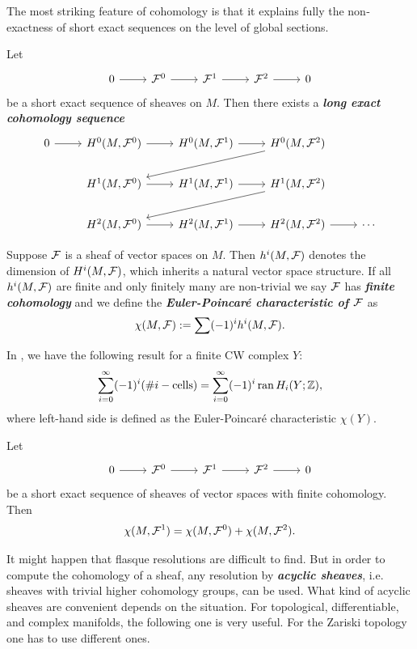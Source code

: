 The most striking feature of cohomology is that it explains fully the non­ exactness of short exact sequences on the level of global sections.
\begin{prop}
	Let
	\[\begin{tikzcd}
		0\arrow[r]&\Fc^0\arrow[r]&\Fc^1\arrow[r]&\Fc^2\arrow[r]&0
	\end{tikzcd}\]
	be a short exact sequence of sheaves on $M$. Then there exists a \textbf{\textit{long exact cohomology sequence}}
	\[\begin{tikzcd}
		0\arrow[r]&H^0(M,\Fc^0)\arrow[r]&H^0(M,\Fc^1)\arrow[r]&H^0(M,\Fc^2)\arrow[dll]\\
		&H^1(M,\Fc^0)\arrow[r]&H^1(M,\Fc^1)\arrow[r]&H^1(M,\Fc^2)\arrow[dll]\\
		&H^2(M,\Fc^0)\arrow[r]&H^2(M,\Fc^1)\arrow[r]&H^2(M,\Fc^2)\arrow[r]&\cdots
	\end{tikzcd}\]
\end{prop}
\begin{defn}
	Suppose $\mathcal{F}$ is a sheaf {\color{cyan}of vector spaces} on $M$. Then $h^i(M,\mathcal{F})$ denotes the dimension of $H^i(M,\mathcal{F})$, which inherits a natural vector space structure. If all $h^i(M,\mathcal{F})$ are finite and only finitely many are non-trivial we say $\mathcal{F}$ has \textbf{\textit{finite cohomology}} and we define the \textbf{\textit{Euler-Poincaré characteristic of $\mathcal{F}$}} as
	\[\chi(M,\mathcal{F}):=\sum(-1)^ih^i(M,\mathcal{F}).\]
\end{defn}
\begin{remark}
	In \cite{hatcher-at}, we have the following result for a finite CW complex $Y$:
	\[\sum_{i=0}^\infty(-1)^i(\#i-\text{cells})=\sum_{i=0}^\infty(-1)^i\operatorname{ran}H_i(Y;\mathbb{Z}),\]
	where left-hand side is defined as the Euler-Poincaré characteristic $\chi(Y)$.
\end{remark}
\begin{coro}
	Let
	\[\begin{tikzcd}
		0\arrow[r]&\Fc^0\arrow[r]&\Fc^1\arrow[r]&\Fc^2\arrow[r]&0
	\end{tikzcd}\]
	be a short exact sequence of sheaves of vector spaces with finite cohomology. Then
	\[\chi(M,\mathcal{F}^1)=\chi(M,\mathcal{F}^0)+\chi(M,\mathcal{F}^2).\]
\end{coro}
It might happen that flasque resolutions are difficult to find. But in order to compute the cohomology of a sheaf, any resolution by \textbf{\textit{acyclic sheaves}}, i.e. sheaves with trivial higher cohomology groups, can be used. What kind of acyclic sheaves are convenient depends on the situation. For topological, differentiable, and complex manifolds, the following one is very useful. For the Zariski topology one has to use different ones.
